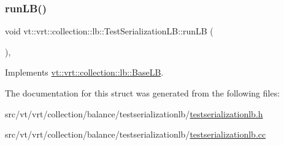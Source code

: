 \subsubsection{\texorpdfstring{run\+L\+B()}{runLB()}}
{\footnotesize\ttfamily void vt\+::vrt\+::collection\+::lb\+::\+Test\+Serialization\+L\+B\+::run\+LB (\begin{DoxyParamCaption}\item[{\hyperlink{namespacevt_a876a9d0cd5a952859c72de8a46881442}{Time\+Type}}]{ }\end{DoxyParamCaption})\hspace{0.3cm}{\ttfamily [override]}, {\ttfamily [virtual]}}



Implements \hyperlink{structvt_1_1vrt_1_1collection_1_1lb_1_1_base_l_b_a7caaf2483f046927fd7534a084a8c1b2}{vt\+::vrt\+::collection\+::lb\+::\+Base\+LB}.



The documentation for this struct was generated from the following files\+:\begin{DoxyCompactItemize}
\item 
src/vt/vrt/collection/balance/testserializationlb/\hyperlink{testserializationlb_8h}{testserializationlb.\+h}\item 
src/vt/vrt/collection/balance/testserializationlb/\hyperlink{testserializationlb_8cc}{testserializationlb.\+cc}\end{DoxyCompactItemize}
